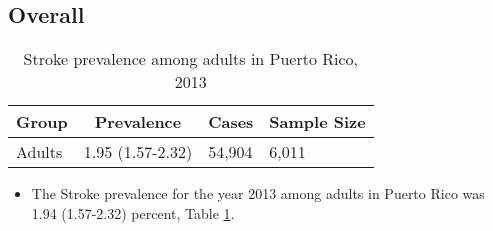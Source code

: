 
\subsection{Overall}




\begin{table}[H]
\caption{Stroke prevalence among adults in Puerto Rico, 2013\label{tab:Overall.tabl.Stroke.2013}} 
\begin{center}
\begin{tabular}{llll}
\hline\hline
\multicolumn{1}{l}{Group}&\multicolumn{1}{c}{Prevalence}&\multicolumn{1}{c}{Cases}&\multicolumn{1}{c}{Sample Size}\tabularnewline
\hline
Adults&1.95 (1.57-2.32)&54,904&6,011\tabularnewline
\hline
\end{tabular}\end{center}

\end{table}




\begin{itemize}


\item The Stroke prevalence for the year 2013 among adults in Puerto Rico was 1.94 (1.57-2.32) percent, 
Table \ref{tab:Overall.tabl.Stroke.2013}.

\end{itemize}



